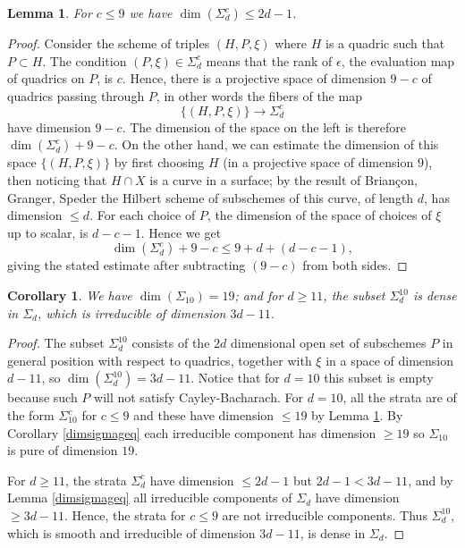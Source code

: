 \documentclass{amsart}
\theoremstyle{plain}
\newtheorem{lemma}[theorem]{Lemma}
\newtheorem{corollary}[theorem]{Corollary}
\numberwithin{equation}{section}
\begin{document}
\begin{lemma}
\label{twodminusone}
For $c\leq 9$ we have $\dim (\Sigma _d^c)\leq 2d-1$.
\end{lemma}
\begin{proof}
Consider the scheme of triples $(H,P,\xi )$ where $H$ is a quadric such that $P\subset H$.
The condition $(P,\xi )\in \Sigma _d^c$ means that the rank of $\epsilon $,
the evaluation map of quadrics on $P$, 
is $c$. Hence, there is a projective space of dimension $9-c$ of quadrics passing
through $P$, in other words the fibers of the map 
$$
\{ (H,P,\xi )\} \rightarrow \Sigma _d^c
$$
have dimension $9-c$. The dimension of the space on the left is therefore 
$\dim (\Sigma _d^c)+9-c$. On the other hand, we can estimate the dimension of this space
$\{ (H,P,\xi )\}$ by first choosing $H$ (in a projective space of dimension $9$), 
then noticing that $H\cap X$ is a curve
in a surface; by the result of Brian\c{c}on, Granger, Speder \cite{BGS}
the Hilbert scheme of subschemes of this curve, of length $d$, has dimension $\leq d$.
For each choice of $P$, the dimension of the 
space of choices of $\xi$ up to scalar, is $d-c-1$. Hence we get 
$$
\dim (\Sigma _d^c)+9-c \leq 9+d+(d-c-1),
$$
giving the stated estimate after subtracting $(9-c)$ from both sides.
\end{proof}

\begin{corollary}
\label{dimsigma1011}
We have $\dim (\Sigma _{10})= 19$; and for $d\geq 11$, the subset $\Sigma ^{10}_d$  is
dense in $\Sigma _d$, which is irreducible of dimension $3d-11$. 
\end{corollary}
\begin{proof}
The subset $\Sigma ^{10}_d$ consists of the $2d$ dimensional open set
of subschemes  $P$ in general position with
respect to quadrics, together with $\xi$ in a space of dimension $d-11$,
so $\dim (\Sigma ^{10}_d)=3d-11$. Notice that for $d=10$ this subset is empty
because such $P$ will not satisfy Cayley-Bacharach. For $d=10$, all 
the strata are of the form $\Sigma _{10}^c$ for $c\leq 9$ and these have dimension $\leq 19$
by Lemma \ref{twodminusone}. 
By Corollary \ref{dimsigmageq} each irreducible component has dimension $\geq 19$ so 
$\Sigma _{10}$ is pure of dimension $19$.

For $d\geq 11$, the strata $\Sigma _d^c$ have
dimension $\leq 2d-1$ but $2d-1<3d-11$, and by Lemma \ref{dimsigmageq} all irreducible
components of $\Sigma _d$ have dimension $\geq 3d-11$. Hence, the strata for $c\leq 9$ are
not irreducible components. Thus $\Sigma ^{10}_d$, which is smooth and irreducible
of dimension $3d-11$,
is dense in $\Sigma _d$. 
\end{proof}
\end{document}
